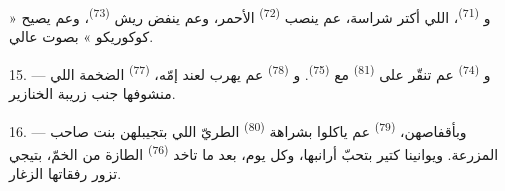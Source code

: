 و \textsuperscript{(71)}، اللي أكتر شراسة، عم ينصب
 \textsuperscript{(72)} الأحمر، وعم ينفض ريش 
\textsuperscript{(73)}، وعم يصيح « كوكوريكو » بصوت عالي.

15. --- و \textsuperscript{(74)} عم تنقّر على
 \textsuperscript{(81)} مع 
\textsuperscript{(75)}. و \textsuperscript{(78)} عم يهرب
لعند إمّه،  \textsuperscript{(77)} الضخمة اللي منشوفها
جنب زريبة الخنازير.

16. --- وبأقفاصهن،  \textsuperscript{(79)} عم ياكلوا
بشراهة  \textsuperscript{(80)} الطريّ اللي بتجيبلهن بنت صاحب
المزرعة. ويوانينا كتير بتحبّ أرانبها، وكل يوم، بعد ما تاخد
 \textsuperscript{(76)} الطازة من الخمّ، بتيجي تزور رفقاتها
الزغار.

\VUsaut{6.0mm}
\VUfilet{22mm}
